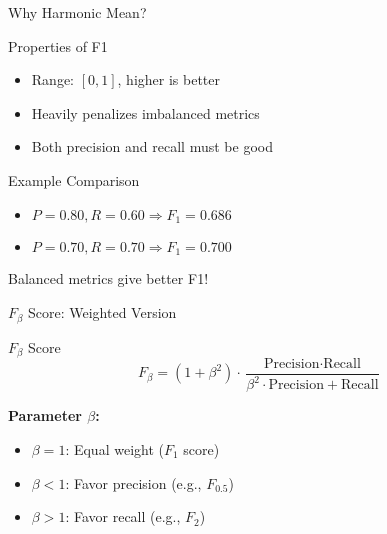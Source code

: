 \documentclass{beamer}
\begin{document}
\begin{frame}{Why Harmonic Mean?}
\begin{keypointsbox}{Properties of F1}
\begin{itemize}
    \item Range: $[0, 1]$, higher is better
    \item Heavily penalizes imbalanced metrics
    \item Both precision and recall must be good
\end{itemize}
\end{keypointsbox}

\vspace{0.3cm}

\begin{examplebox}{Example Comparison}
\begin{itemize}
    \item $P=0.80, R=0.60 \Rightarrow F_1 = 0.686$
    \item $P=0.70, R=0.70 \Rightarrow F_1 = 0.700$
\end{itemize}

Balanced metrics give better F1!
\end{examplebox}
\end{frame}

\begin{frame}{$F_\beta$ Score: Weighted Version}
\begin{definitionbox}{$F_\beta$ Score}
$$F_\beta = (1 + \beta^2) \cdot \frac{\text{Precision} \cdot \text{Recall}}{\beta^2 \cdot \text{Precision} + \text{Recall}}$$

\vspace{0.2cm}

\textbf{Parameter $\beta$:}
\begin{itemize}
    \item $\beta = 1$: Equal weight ($F_1$ score)
    \item $\beta < 1$: Favor precision (e.g., $F_{0.5}$)
    \item $\beta > 1$: Favor recall (e.g., $F_2$)
\end{itemize}
\end{definitionbox}
\end{frame}
\end{document}
